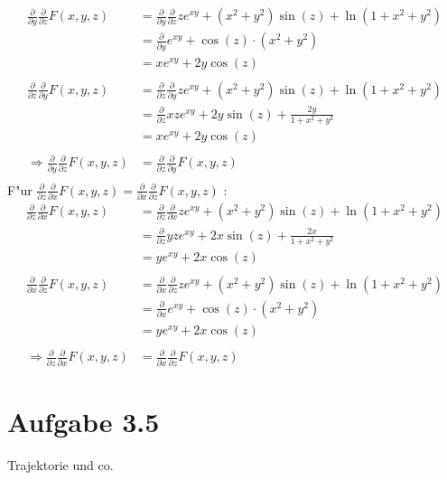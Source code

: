 \documentclass{theozettel}
\begin{document}
\begin{align*}
\frac{\partial}{\partial y}\frac{\partial}{\partial z}F\left(x,y,z\right) &= \frac{\partial}{\partial y}\frac{\partial}{\partial z}ze^{xy}+\left(x^2+y^2\right)\sin\left(z\right)+\ln\left(1+x^2+y^2\right)\\
&=\frac{\partial}{\partial y}e^{xy}+\cos\left(z\right)\cdot\left( x^2+y^2\right)\\
&= xe^{xy}+2y\cos\left(z\right)\\\\
\frac{\partial}{\partial z}\frac{\partial}{\partial y}F\left(x,y,z\right)&= \frac{\partial}{\partial z}\frac{\partial}{\partial y}ze^{xy}+\left(x^2+y^2\right)\sin\left(z\right)+\ln\left(1+x^2+y^2\right)\\
&= \frac{\partial}{\partial z}xze^{xy}+2y\sin\left( z\right)+\frac{2y}{1+x^2+y^2}\\
&= xe^{xy}+2y\cos\left(z\right)\\\\
\Rightarrow \frac{\partial}{\partial y}\frac{\partial}{\partial z}F\left(x,y,z\right) &=\frac{\partial}{\partial z}\frac{\partial}{\partial y}F\left(x,y,z\right)\\
\end{align*}
F"ur $\frac{\partial}{\partial z}\frac{\partial}{\partial x}F\left(x,y,z\right) =\frac{\partial}{\partial x}\frac{\partial}{\partial z}F\left(x,y,z\right)$ :
\begin{align*}
\frac{\partial}{\partial z}\frac{\partial}{\partial x}F\left(x,y,z\right) &= \frac{\partial}{\partial z}\frac{\partial}{\partial x}ze^{xy}+\left(x^2+y^2\right)\sin\left(z\right)+\ln\left(1+x^2+y^2\right)\\
&=\frac{\partial}{\partial z}yze^{xy}+2x\sin\left(z\right)+\frac{2x}{1+x^2+y^2}\\
&= ye^{xy}+2x\cos\left(z\right)\\\\
\frac{\partial}{\partial x}\frac{\partial}{\partial z}F\left(x,y,z\right)&= \frac{\partial}{\partial x}\frac{\partial}{\partial z}ze^{xy}+\left(x^2+y^2\right)\sin\left(z\right)+\ln\left(1+x^2+y^2\right)\\
&= \frac{\partial}{\partial x}e^{xy}+\cos\left(z\right)\cdot\left(x^2+y^2\right)\\
&= ye^{xy}+2x\cos\left(z\right)\\\\
\Rightarrow \frac{\partial}{\partial z}\frac{\partial}{\partial x}F\left(x,y,z\right) &=\frac{\partial}{\partial x}\frac{\partial}{\partial z}F\left(x,y,z\right)
\end{align*}
\newpage
\section*{Aufgabe 3.5} Trajektorie und co.
\end{document}
